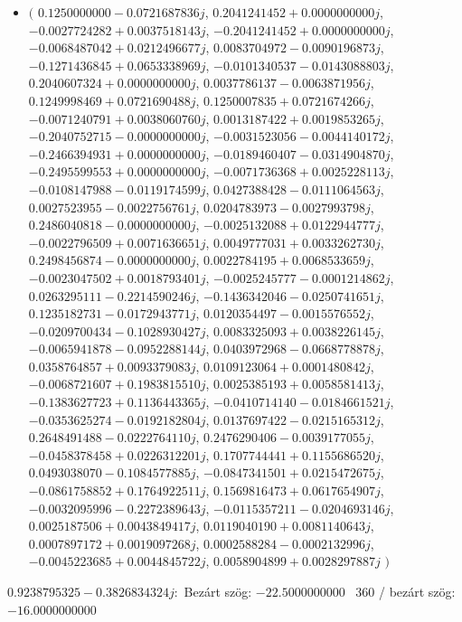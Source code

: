 \documentclass[14pt,a4paper]{article}
\begin{document}
\begin{itemize}
\item
$\big($
$0.1250000000-0.0721687836j$, $0.2041241452+0.0000000000j$, $-0.0027724282+0.0037518143j$, $-0.2041241452+0.0000000000j$, $-0.0068487042+0.0212496677j$, $0.0083704972-0.0090196873j$, $-0.1271436845+0.0653338969j$, $-0.0101340537-0.0143088803j$, $0.2040607324+0.0000000000j$, $0.0037786137-0.0063871956j$, $0.1249998469+0.0721690488j$, $0.1250007835+0.0721674266j$, $-0.0071240791+0.0038060760j$, $0.0013187422+0.0019853265j$, $-0.2040752715-0.0000000000j$, $-0.0031523056-0.0044140172j$, $-0.2466394931+0.0000000000j$, $-0.0189460407-0.0314904870j$, $-0.2495599553+0.0000000000j$, $-0.0071736368+0.0025228113j$, $-0.0108147988-0.0119174599j$, $0.0427388428-0.0111064563j$, $0.0027523955-0.0022756761j$, $0.0204783973-0.0027993798j$, $0.2486040818-0.0000000000j$, $-0.0025132088+0.0122944777j$, $-0.0022796509+0.0071636651j$, $0.0049777031+0.0033262730j$, $0.2498456874-0.0000000000j$, $0.0022784195+0.0068533659j$, $-0.0023047502+0.0018793401j$, $-0.0025245777-0.0001214862j$, $0.0263295111-0.2214590246j$, $-0.1436342046-0.0250741651j$, $0.1235182731-0.0172943771j$, $0.0120354497-0.0015576552j$, $-0.0209700434-0.1028930427j$, $0.0083325093+0.0038226145j$, $-0.0065941878-0.0952288144j$, $0.0403972968-0.0668778878j$, $0.0358764857+0.0093379083j$, $0.0109123064+0.0001480842j$, $-0.0068721607+0.1983815510j$, $0.0025385193+0.0058581413j$, $-0.1383627723+0.1136443365j$, $-0.0410714140-0.0184661521j$, $-0.0353625274-0.0192182804j$, $0.0137697422-0.0215165312j$, $0.2648491488-0.0222764110j$, $0.2476290406-0.0039177055j$, $-0.0458378458+0.0226312201j$, $0.1707744441+0.1155686520j$, $0.0493038070-0.1084577885j$, $-0.0847341501+0.0215472675j$, $-0.0861758852+0.1764922511j$, $0.1569816473+0.0617654907j$, $-0.0032095996-0.2272389643j$, $-0.0115357211-0.0204693146j$, $0.0025187506+0.0043849417j$, $0.0119040190+0.0081140643j$, $0.0007897172+0.0019097268j$, $0.0002588284-0.0002132996j$, $-0.0045223685+0.0044845722j$, $0.0058904899+0.0028297887j$
$\big)$
\end{itemize}
$0.9238795325-0.3826834324j$:\
Bezárt szög: $-22.5000000000$ \
360 / bezárt szög: $-16.0000000000$\
\end{document}
